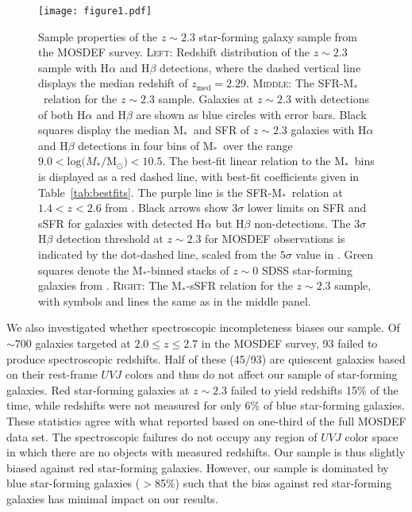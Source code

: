 \documentclass[iop,twocolappendix]{emulateapj}
\newcommand{\mstar}{$\mbox{M}_*$}
\begin{document}
\begin{figure*}
 \texttt{[image: figure1.pdf]}
 \centering
 \caption{Sample properties of the $z\sim2.3$ star-forming galaxy sample from the MOSDEF survey.
  \textsc{Left:} Redshift distribution of the $z\sim2.3$ sample with H$\alpha$ and H$\beta$ detections,
 where the dashed vertical line displays the median redshift of $z_{\text{med}}=2.29$.
  \textsc{Middle:} The SFR-\mstar\ relation for the $z\sim2.3$ sample.  Galaxies at $z\sim2.3$ with
 detections of both H$\alpha$ and H$\beta$ are shown as blue circles with error bars.
  Black squares display the median \mstar\ and SFR of $z\sim2.3$ galaxies with H$\alpha$ and H$\beta$
 detections in four bins of \mstar\ over the range $9.0<\text{log(}M_*/\text{M}_{\odot})<10.5$.
  The best-fit linear relation to the \mstar\ bins is displayed as a red dashed line,
 with best-fit coefficients given in Table~\ref{tab:bestfits}.
  The purple line is the SFR-\mstar\ relation at $1.4<z<2.6$ from \citet{shi15}.
  Black arrows show $3\sigma$ lower limits on SFR and sSFR for galaxies with detected H$\alpha$ but H$\beta$ non-detections.
  The $3\sigma$ H$\beta$ detection threshold at $z\sim2.3$ for MOSDEF observations is indicated
 by the dot-dashed line, scaled from the $5\sigma$ value in \citet{kri15}.
  Green squares denote the \mstar-binned stacks of $z\sim0$ SDSS star-forming galaxies from \citet{and13}.
  \textsc{Right:} The \mstar-sSFR relation for the $z\sim2.3$ sample, with symbols and lines
 the same as in the middle panel.
}\label{fig1}
\end{figure*}

We also investigated whether spectroscopic incompleteness biases our sample.
  Of $\sim700$ galaxies targeted at $2.0\leq z\leq2.7$ in the MOSDEF survey,
 93 failed to produce spectroscopic redshifts.
  Half of these (45/93) are quiescent galaxies based on their rest-frame $UVJ$ colors and thus do not
 affect our sample of star-forming galaxies.  Red star-forming galaxies at $z\sim2.3$ failed to yield redshifts
 15\% of the time, while redshifts were not measured for only 6\% of blue star-forming galaxies.
  These statistics agree with what \citet{kri15} reported based on one-third of the full MOSDEF data set.
  The spectroscopic failures do not occupy any region of $UVJ$ color space in which there are no objects
 with measured redshifts.  Our sample is thus slightly biased against red star-forming galaxies.
  However, our sample is dominated by blue star-forming galaxies ($>$85\%) such that the bias against red
 star-forming galaxies has minimal impact on our results.
\end{document}
